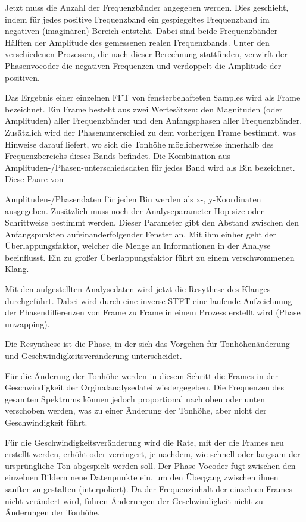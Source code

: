 Jetzt muss die Anzahl der Frequenzbänder angegeben werden. Dies geschieht, indem für jedes positive Frequenzband ein gespiegeltes Frequenzband im 
negativen (imaginären) Bereich entsteht.
Dabei sind beide Frequenzbänder Hälften der Amplitude des gemessenen realen Frequenzbands. Unter den verschiedenen Prozessen, die nach dieser Berechnung stattfinden, verwirft der Phasenvocoder die negativen Frequenzen und verdoppelt die Amplitude der positiven.

Das Ergebnis einer einzelnen FFT von fensterbehafteten Samples wird als Frame bezeichnet.
Ein Frame besteht aus zwei Wertesätzen: den Magnituden (oder Amplituden) aller Frequenzbänder und den Anfangsphasen aller Frequenzbänder.
Zusätzlich wird der Phasenunterschied zu dem vorherigen Frame bestimmt, was Hinweise darauf liefert, wo sich die Tonhöhe möglicherweise innerhalb des Frequenzbereichs dieses Bands befindet. 
Die Kombination aus Amplituden-/Phasen-unterschiedsdaten für jedes Band wird als Bin bezeichnet. 
Diese Paare von 

Amplituden-/Phasendaten für jeden Bin werden als x-, y-Koordinaten ausgegeben.
Zusätzlich muss noch der Analyseparameter Hop size oder Schrittweise bestimmt werden. Dieser Parameter gibt den Abstand zwischen den Anfangspunkten aufeinanderfolgender Fenster an. Mit ihm einher geht der Überlappungsfaktor, welcher die Menge an Informationen in der Analyse beeinflusst. Ein zu großer Überlappungsfaktor führt zu einem verschwommenen Klang.

Mit den aufgestellten Analysedaten wird jetzt die Resythese des Klanges durchgeführt. Dabei wird durch eine inverse STFT eine laufende Aufzeichnung der Phasendifferenzen von Frame zu Frame in einem Prozess erstellt wird (Phase unwapping).

Die Resynthese ist die Phase, in der sich das Vorgehen für Tonhöhenänderung und Geschwindigkeitsveränderung unterscheidet.

Für die Änderung der Tonhöhe werden in diesem Schritt die Frames in der Geschwindigkeit der Orginalanalysedatei wiedergegeben. 
Die Frequenzen des gesamten Spektrums können jedoch proportional nach oben oder unten verschoben werden, was zu einer Änderung der Tonhöhe, aber nicht der Geschwindigkeit führt.

Für die Geschwindigkeitsveränderung wird die Rate, mit der die Frames neu erstellt werden, erhöht oder verringert, je nachdem, wie schnell oder langsam der ursprüngliche Ton abgespielt werden soll. 
Der Phase-Vocoder fügt zwischen den einzelnen Bildern neue Datenpunkte ein, um den Übergang zwischen ihnen sanfter zu gestalten (interpoliert).
Da der Frequenzinhalt der einzelnen Frames nicht verändert wird, führen Änderungen der Geschwindigkeit nicht zu Änderungen der Tonhöhe. 

